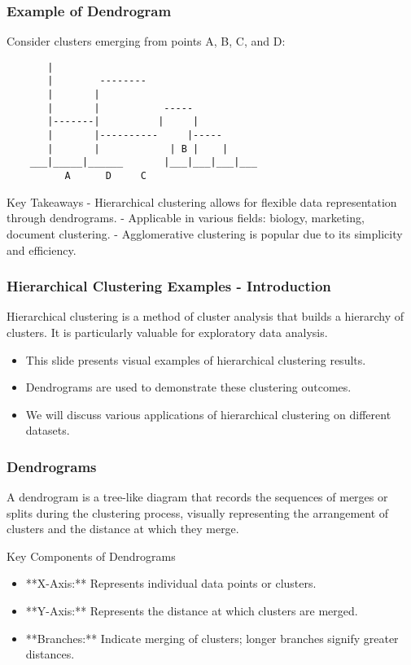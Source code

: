 \documentclass[aspectratio=169]{beamer}
\begin{document}
\begin{frame}[fragile]
    \frametitle{Example of Dendrogram}
    Consider clusters emerging from points A, B, C, and D:

    \begin{lstlisting}
       |
       |        --------
       |       |
       |       |           -----
       |-------|          |     |
       |       |----------     |----- 
       |       |            | B |    |
    ___|_____|______       |___|___|___|___
          A      D     C
    \end{lstlisting}
    
    \begin{block}{Key Takeaways}
        - Hierarchical clustering allows for flexible data representation through dendrograms.
        - Applicable in various fields: biology, marketing, document clustering.
        - Agglomerative clustering is popular due to its simplicity and efficiency.
    \end{block}
\end{frame}

\begin{frame}[fragile]
    \frametitle{Hierarchical Clustering Examples - Introduction}
    Hierarchical clustering is a method of cluster analysis that builds a hierarchy of clusters. It is particularly valuable for exploratory data analysis. 
    \begin{itemize}
        \item This slide presents visual examples of hierarchical clustering results.
        \item Dendrograms are used to demonstrate these clustering outcomes.
        \item We will discuss various applications of hierarchical clustering on different datasets.
    \end{itemize}
\end{frame}

\begin{frame}[fragile]
    \frametitle{Dendrograms}
    A dendrogram is a tree-like diagram that records the sequences of merges or splits during the clustering process, visually representing the arrangement of clusters and the distance at which they merge.
    \begin{block}{Key Components of Dendrograms}
        \begin{itemize}
            \item **X-Axis:** Represents individual data points or clusters.
            \item **Y-Axis:** Represents the distance at which clusters are merged.
            \item **Branches:** Indicate merging of clusters; longer branches signify greater distances.
        \end{itemize}
    \end{block}
\end{frame}
\end{document}

